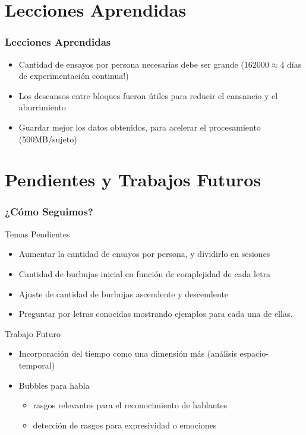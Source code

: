 \documentclass[10pt]{beamer}
\begin{document}
  \section{Lecciones Aprendidas}
	\begin{frame}
	\frametitle{Lecciones Aprendidas}
	    \begin{itemize}
	    \item Cantidad de ensayos por persona necesarias debe ser grande ($162000 \approx 4$ días de experimentación continua\alert{!})
	    \item Los descansos entre bloques fueron útiles para reducir el cansancio y el aburrimiento
	    \item Guardar mejor los datos obtenidos, para acelerar el procesamiento (500MB/sujeto)
	    \end{itemize}
	\end{frame}

  \section{Pendientes y Trabajos Futuros}
	\begin{frame}
	\frametitle{¿C\'omo Seguimos?}
	  \begin{block}{Temas Pendientes}
	    \begin{itemize}
		\item Aumentar la cantidad de ensayos por persona, y dividirlo en sesiones
		\item Cantidad de burbujas inicial en función de complejidad de cada letra
		\item Ajuste de cantidad de burbujas ascendente y descendente
		\item Preguntar por letras conocidas mostrando ejemplos para cada una de ellas. 
	    \end{itemize}
	  \end{block} \pause

	  \begin{block}{Trabajo Futuro}
	   \begin{itemize}
		\item Incorporación del tiempo como una dimensi\'on más (an\'alisis espacio-temporal)
		\item Bubbles para habla
		    \begin{itemize}
		      \item rasgos relevantes para el reconocimiento de hablantes
		      \item detección de rasgos para expresividad o emociones
		    \end{itemize}
	    \end{itemize}                     
	  \end{block}	    
	\end{frame}
\end{document}
